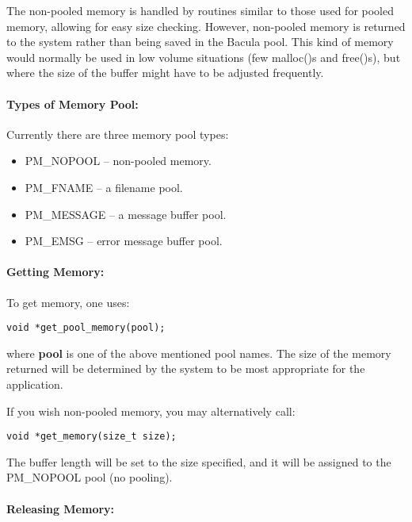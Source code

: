 The non-pooled memory is handled by routines similar to those used for pooled
memory, allowing for easy size checking. However, non-pooled memory is
returned to the system rather than being saved in the Bacula pool. This kind
of memory would normally be used in low volume situations (few malloc()s and
free()s), but where the size of the buffer might have to be adjusted
frequently. 

\paragraph*{Types of Memory Pool:}

Currently there are three memory pool types: 

\begin{itemize}
\item PM\_NOPOOL -- non-pooled memory. 
\item PM\_FNAME -- a filename pool. 
\item PM\_MESSAGE -- a message buffer pool. 
\item PM\_EMSG -- error message buffer pool. 
   \end{itemize}

\paragraph*{Getting Memory:}

To get memory, one uses: 

\footnotesize
\begin{verbatim}
void *get_pool_memory(pool);
\end{verbatim}
\normalsize

where {\bf pool} is one of the above mentioned pool names. The size of the
memory returned will be determined by the system to be most appropriate for
the application. 

If you wish non-pooled memory, you may alternatively call: 

\footnotesize
\begin{verbatim}
void *get_memory(size_t size);
\end{verbatim}
\normalsize

The buffer length will be set to the size specified, and it will be assigned
to the PM\_NOPOOL pool (no pooling). 

\paragraph*{Releasing Memory:}

